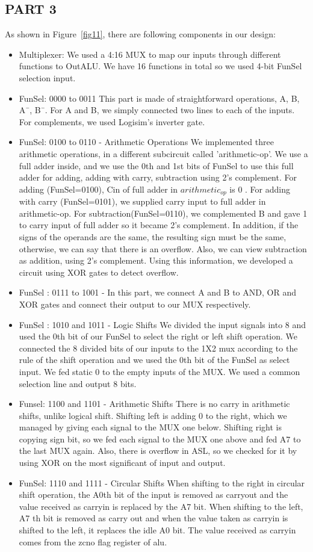 \documentclass[pdftex,12pt,a4paper]{article}
\begin{document}
\subsection{PART 3}
As shown in Figure~\ref{fig11}, there are following components in our design:
\begin{itemize}
\item Multiplexer: We used a 4:16 MUX to map our inputs through different functions to OutALU. We have 16 functions in total so we used 4-bit FunSel selection input. 
\item FunSel: 0000 to 0011 This part is made of straightforward operations, A, B, A¯, B¯. For A and B, we simply connected two lines to each of the inputs. For complements, we used Logisim's inverter gate. 
\item FunSel: 0100 to 0110 - Arithmetic Operations We implemented three arithmetic operations, in a different subcircuit called 'arithmetic-op'. We use a full adder inside, and we use the 0th and 1st bits of FunSel to use this full adder for adding, adding with carry, subtraction using 2's complement. For adding (FunSel=0100), Cin of full adder in $arithmetic_{op}$ is 0 . For adding with carry (FunSel=0101), we supplied carry input to full adder in arithmetic-op. For subtraction(FunSel=0110), we complemented B and gave 1 to carry input of full adder so it became 2's complement. In addition, if the signs of the operands are the same, the resulting sign must be the same, otherwise, we can say that there is an overflow. Also, we can view subtraction as addition, using 2's complement. Using this information, we developed a circuit using XOR gates to detect overflow. 
\item FunSel : 0111 to 1001 - In this part, we connect A and B to AND, OR and XOR gates and connect their output to our MUX respectively. 
\item FunSel : 1010 and 1011 - Logic Shifts We divided the input signals into 8 and used the 0th bit of our FunSel to select the right or left shift operation. We connected the 8 divided bits of our inputs to the 1X2 mux according to the rule of the shift operation and we used the 0th bit of the FunSel as select input. We fed static 0 to the empty inputs of the MUX. We used a common selection line and output 8 bits.
\item Funsel: 1100 and 1101 - Arithmetic Shifts There is no carry in arithmetic shifts, unlike logical shift. Shifting left is adding 0 to the right, which we managed by giving each signal to the MUX one below. Shifting right is copying sign bit, so we fed each signal to the MUX one above and fed A7 to the last MUX again. Also, there is overflow in ASL, so we checked for it by using XOR on the most significant of input and output. 
\item FunSel: 1110 and 1111 - Circular Shifts When shifting to the right in circular shift operation, the A0th bit of the input is removed as carryout and the value received as carryin is replaced by the A7 bit.
When shifting to the left, A7 th bit is removed as carry out and when the value taken as carryin is shifted to the left, it replaces the idle A0 bit. The value received as carryin comes from the zcno flag register of alu.


\end{itemize}
\end{document}

